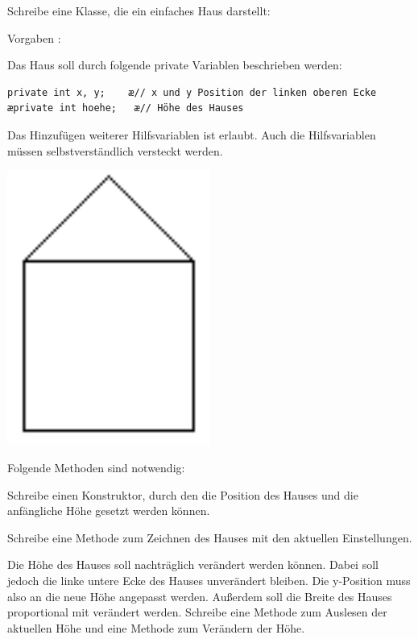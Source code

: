 \begin{compactenum}[a)]
\begin{minipage}{0.75\textwidth}
\item Schreibe eine Klasse, die ein einfaches Haus darstellt:

Vorgaben :

Das Haus soll durch folgende private Variablen beschrieben werden:

\begin{lstlisting}
private int x, y;    æ// x und y Position der linken oberen Ecke
æprivate int hoehe;   æ// Höhe des Hauses
\end{lstlisting}

Das Hinzufügen weiterer Hilfsvariablen ist erlaubt. Auch die Hilfsvariablen
müssen selbstverständlich versteckt werden.
\end{minipage}
\begin{minipage}{0.25\textwidth}
\begin{center}
\includegraphics[width=0.5\textwidth]{./inf/SEKII/12_Java_Datenkapselung/haus.png}
\end{center}
\end{minipage}

\vspace{3mm}

Folgende Methoden sind notwendig:

\begin{compactenum}[1)]
\item Schreibe einen Konstruktor, durch den die Position des Hauses und die
anfängliche Höhe gesetzt werden können.
\item Schreibe eine Methode zum Zeichnen des Hauses mit den aktuellen
Einstellungen.
\item Die Höhe des Hauses soll nachträglich verändert werden können. Dabei soll
jedoch die linke untere Ecke des Hauses unverändert bleiben. Die y-Position
muss also an die neue Höhe angepasst werden. Außerdem soll die Breite des
Hauses proportional mit verändert werden. Schreibe eine Methode zum Auslesen
der aktuellen Höhe und eine Methode zum Verändern der Höhe.
\end{compactenum}


\end{compactenum}
